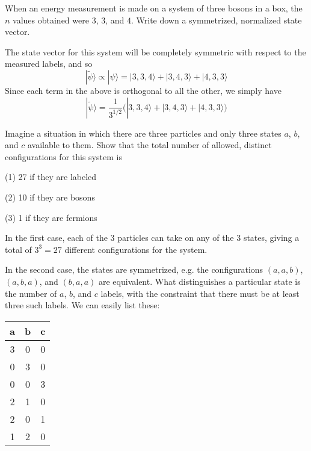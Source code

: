 \documentclass[../principles-of-quantum-mechanics.tex]{subfiles}
\begin{document}
\begin{questions}
		\question When an energy measurement is made on a system of three bosons in a box, the $n$ values obtained were $3$, $3$, and $4$. Write down a symmetrized, normalized state vector.
		
		\begin{solution}
			The state vector for this system will be completely symmetric with respect to the measured labels, and so
			$$|\tilde{\psi}\rangle \propto |\psi\rangle = |3, 3, 4\rangle + |3, 4, 3\rangle + |4, 3, 3\rangle$$
			Since each term in the above is orthogonal to all the other, we simply have
			$$|\tilde{\psi}\rangle = \frac{1}{3^{1/2}}\Big(|3, 3, 4\rangle + |3, 4, 3\rangle + |4, 3, 3\rangle\Big)$$
		\end{solution}
		
		\question Imagine a situation in which there are three particles and only three states $a$, $b$, and $c$ available to them. Show that the total number of allowed, distinct configurations for this system is
		
		(1) 27 if they are labeled
		
		(2) 10 if they are bosons
		
		(3) 1 if they are fermions
		
		\begin{solution}
			In the first case, each of the 3 particles can take on any of the 3 states, giving a total of $3^3 = 27$ different configurations for the system.
			
			In the second case, the states are symmetrized, e.g. the configurations $(a, a, b)$, $(a, b, a)$, and $(b, a, a)$ are equivalent. What distinguishes a particular state is the number of $a$, $b$, and $c$ labels, with the constraint that there must be at least three such labels. We can easily list these:
			
			\begin{center}
				\begin{tabular}{c|c|c}
					a & b & c \\
					\hline
					3 & 0 & 0 \\
	
					0 & 3 & 0 \\
	
					0 & 0 & 3 \\
	
					2 & 1 & 0 \\
	
					2 & 0 & 1 \\
	
					1 & 2 & 0 \\
	

\end{tabular}
\end{center}
\end{solution}
\end{questions}
\end{document}
